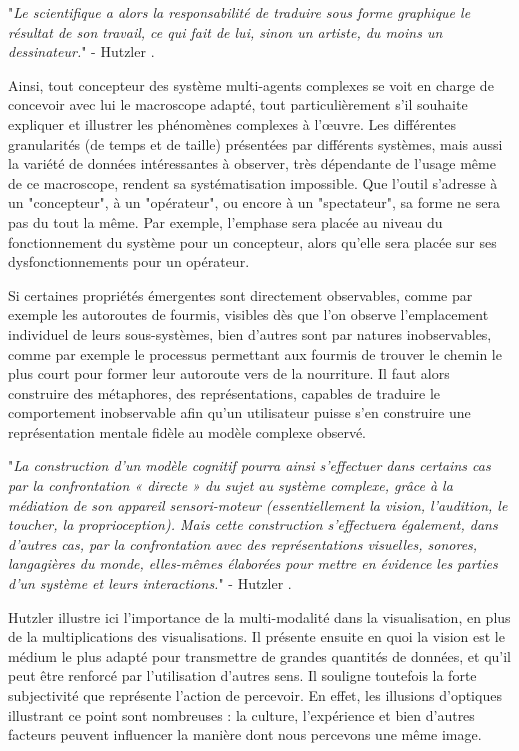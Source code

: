 		"\textit{Le scientifique a alors la responsabilité de traduire sous forme graphique le résultat de son travail, ce qui fait de lui, sinon un artiste, du moins un dessinateur.}" - Hutzler \cite{hutzler_du_2000}.

	Ainsi, tout concepteur des système multi-agents complexes se voit en charge de concevoir avec lui le macroscope adapté, tout particulièrement s'il souhaite expliquer et illustrer les phénomènes complexes à l'œuvre. Les différentes granularités (de temps et de taille) présentées par différents systèmes, mais aussi la variété de données intéressantes à observer, très dépendante de l'usage même de ce macroscope, rendent sa systématisation impossible. Que l'outil s'adresse à un "concepteur", à un "opérateur", ou encore à un "spectateur", sa forme ne sera pas du tout la même. Par exemple, l'emphase sera placée au niveau du fonctionnement du système pour un concepteur, alors qu'elle sera placée sur ses dysfonctionnements pour un opérateur.
		
	
	Si certaines propriétés émergentes sont directement observables, comme par exemple les autoroutes de fourmis, visibles dès que l'on observe l'emplacement individuel de leurs sous-systèmes, bien d'autres sont par natures inobservables, comme par exemple le processus permettant aux fourmis de trouver le chemin le plus court pour former leur autoroute vers de la nourriture. Il faut alors construire des métaphores, des représentations, capables de traduire le comportement inobservable afin qu'un utilisateur puisse s'en construire une représentation mentale fidèle au modèle complexe observé.

		"\textit{La construction d'un modèle cognitif pourra ainsi s'effectuer dans certains cas par la confrontation « directe » du sujet au système complexe, grâce à la médiation de son appareil sensori-moteur (essentiellement la vision, l'audition, le toucher, la proprioception). Mais cette construction s'effectuera également, dans d'autres cas, par la confrontation avec des représentations visuelles, sonores, langagières du monde, elles-mêmes élaborées pour mettre en évidence les parties d'un système et leurs interactions.}" - Hutzler \cite{hutzler_du_2000}.
		
		Hutzler illustre ici l'importance de la multi-modalité dans la visualisation, en plus de la multiplications des visualisations. Il présente ensuite en quoi la vision est le médium le plus adapté pour transmettre de grandes quantités de données, et qu'il peut être renforcé par l'utilisation d'autres sens. Il souligne toutefois la forte subjectivité que représente l'action de percevoir. En effet, les illusions d'optiques illustrant ce point sont nombreuses : la culture, l'expérience et bien d'autres facteurs peuvent influencer la manière dont nous percevons une même image.
		
